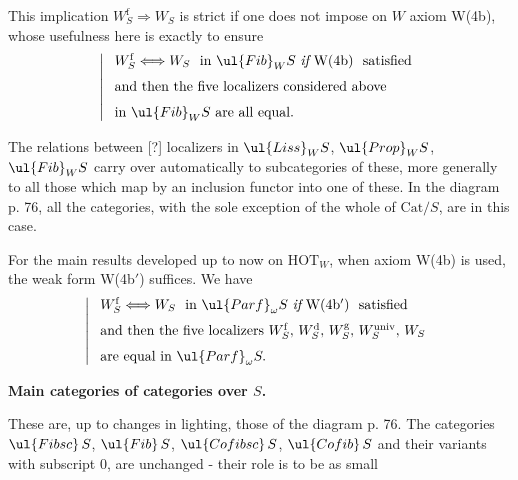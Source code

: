 This implication $W_S^{\mathrm{f}} \Longrightarrow W_S$ is strict if one does not impose on $W$ axiom W(4b), whose usefulness here is exactly to ensure
\[
\left|\;
\begin{array}{l}
W_S^{\mathrm{f}} \Longleftrightarrow W_S \ \text{ in } \ul{Fib}_W S \ \textit{if}\ \mathrm{W}(4\mathrm{b})\ \ \text{satisfied}\\[1.5ex]
\text{and then the five localizers considered above}\\[1.5ex]
\text{in } \ul{Fib}_W S \text{ are all equal.}
\end{array}
\right.
\]

The relations between [?] localizers in $\ul{Liss}_W S$, $\ul{Prop}_W S$, $\ul{Fib}_W S$ carry over automatically to subcategories of these, more generally to all those which map
by an inclusion functor into one of these. In the diagram p. 76, all the categories, with the sole exception of the whole of $\mathrm{Cat}/S$, are in this case.

For the main results developed up to now on $\mathrm{HOT}_W$, when axiom W(4b) is used, the weak form W(4b$'$) suffices. We have
\[
\left|\;
\begin{array}{l}
W_S^{\mathrm{f}} \Longleftrightarrow W_S \ \text{ in } \ul{Parf}_\omega S \ \textit{if}\ \mathrm{W}(4\mathrm{b}')\ \ \text{satisfied}\\[1.5ex]
\text{and then the five localizers } W_S^{\mathrm{f}},\, W_S^{\mathrm{d}},\, W_S^{\mathrm{g}},\, W_S^{\mathrm{univ}},\, W_S\\[1.5ex]
\text{are equal in } \ul{Parf}_\omega S.
\end{array}
\right.
\]

 \textbf{Main categories of categories over $S$.}

These are, up to changes in lighting, those of the diagram p. 76. The categories $\ul{Fibsc}\,S$, $\ul{Fib}\,S$, $\ul{Cofibsc}\,S$, $\ul{Cofib}\,S$ and their variants with subscript 0, are unchanged - their role is to be as small


